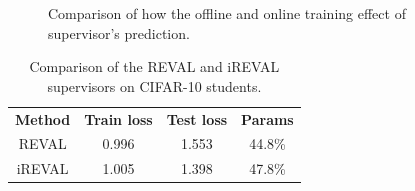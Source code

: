 \documentclass[english]{sobraep}
\begin{document}
\begin{figure}[htbp]
\centering
\captionsetup{justification=centering}
\caption{Comparison of how the offline and online training effect of supervisor's prediction.}
\label{fig:CIFAR10_REVAl_Supervisor}
\end{figure}

\begin{table}[H]
	\centering
	\begin{tabular}{cccc}
		\toprule [1.3pt]	
		\hline
		\multirow{2}{1.1cm}{\centering \textbf{Method}} & \multirow{2}{*}{\textbf{Train loss}} &
		\multirow{2}{*}{\textbf{Test loss}} & \multirow{2}{*}{\textbf{Params}} \\
		&  &  & \\		
		\hline
		REVAL &  0.996  & 1.553 &  44.8\%\\
		\hline
		iREVAL &  1.005  & 1.398 & 47.8\%\\
		\hline
		\bottomrule[1.3pt]
	\end{tabular}
	\caption{Comparison of the REVAL and iREVAL supervisors on CIFAR-10 students.}
	\label{table:test_loss_supervisor}
\end{table}
\end{document}
